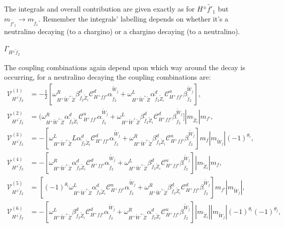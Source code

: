 \documentclass[final,3p,times,pdflatex]{elsarticle}
\begin{document}
The integrals and overall contribution are given exactly as for $H^{\pm} \tilde{f'}_1$ but $m_{\tilde{f'}_1} \rightarrow m_{\tilde{f}_1}$. Remember the integrals' labelling depends on whether it's a neutralino decaying (to a chargino) or a chargino decaying (to a neutralino).

\textbf{\underline{$\Gamma_{H^{\pm} \tilde{f}_2}$}}

The coupling combinations again depend upon which way around the decay is occurring, for a neutralino decaying the coupling combinations are:
\begin{align}
\mathcal{V}_{H^{\pm} \tilde{f}_2}^{(1)} &= -\frac{1}{2}[\omega_{H^+ \tilde{W}^+ \tilde{Z}}^R \beta_{\tilde{f}_2 \tilde{Z}_i}^{d} \mathcal{C}_{H^+ f f'}^d \alpha_{\tilde{f}_2}^{\tilde{W}_j} + \omega_{H^+ \tilde{W}^+ \tilde{Z}}^L \alpha_{\tilde{f}_2 \tilde{Z}_i}^{d} \mathcal{C}_{H^+ f f'}^u \beta_{\tilde{f}_2}^{\tilde{W}_j}], \\
\mathcal{V}_{H^{\pm} \tilde{f}_2}^{(2)} &= (\omega_{H^+ \tilde{W}^+ \tilde{Z}}^R \alpha_{\tilde{f}_2 \tilde{Z}_i}^{d} \mathcal{C}_{H^+ f f'}^u \alpha_{\tilde{f}_2}^{\tilde{W}_j} + \omega_{H^+ \tilde{W}^+ \tilde{Z}}^L \beta_{\tilde{f}_2 \tilde{Z}_i}^{d} \mathcal{C}_{H^+ f f'}^d \beta_{\tilde{f}_2}^{\tilde{W}_j}]|m_{\tilde{Z}_i}|m_{f'}, \\
\mathcal{V}_{H^{\pm} \tilde{f}_2}^{(3)} &= -[\omega_{H^+ \tilde{W}^+ \tilde{Z}}^LL \alpha_{\tilde{f}_2 \tilde{Z}_i}^{d} \mathcal{C}_{H^+ f f'}^d \alpha_{\tilde{f}_2}^{\tilde{W}_j} + \omega_{H^+ \tilde{W}^+ \tilde{Z}}^R \beta_{\tilde{f}_2 \tilde{Z}_i}^{d} \mathcal{C}_{H^+ f f'}^u \beta_{\tilde{f}_2}^{\tilde{W}_j}]m_{f}|m_{\tilde{W}_j}|(-1)^{\theta_i}, \\
\mathcal{V}_{H^{\pm} \tilde{f}_2}^{(4)} &= -[\omega_{H^+ \tilde{W}^+ \tilde{Z}}^R \alpha_{\tilde{f}_2 \tilde{Z}_i}^{d} \mathcal{C}_{H^+ f f'}^d \alpha_{\tilde{f}_2}^{\tilde{W}_j} + \omega_{H^+ \tilde{W}^+ \tilde{Z}}^L \beta_{\tilde{f}_2 \tilde{Z}_i}^{d} \mathcal{C}_{H^+ f f'}^u \beta_{\tilde{f}_2}^{\tilde{W}_j}]|m_{\tilde{Z}_i}|m_{f}, \\
\mathcal{V}_{H^{\pm} \tilde{f}_2}^{(5)} &= [(-1)^{\theta_i}\omega_{H^+ \tilde{W}^+ \tilde{Z}}^L \alpha_{\tilde{f}_2 \tilde{Z}_i}^{d} \mathcal{C}_{H^+ f f'}^u \alpha_{\tilde{f}_2}^{\tilde{W}_j} + \omega_{H^+ \tilde{W}^+ \tilde{Z}}^R \beta_{\tilde{f}_2 \tilde{Z}_i}^{d} \mathcal{C}_{H^+ f f'}^d \beta_{\tilde{f}_2}^{\tilde{W}_j}]m_{f'}|m_{\tilde{W}_j}|, \\
\mathcal{V}_{H^{\pm} \tilde{f}_2}^{(6)} &= -[\omega_{H^+ \tilde{W}^+ \tilde{Z}}^L \beta_{\tilde{f}_2 \tilde{Z}_i}^{d} \mathcal{C}_{H^+ f f'}^d \alpha_{\tilde{f}_2}^{\tilde{W}_j} + \omega_{H^+ \tilde{W}^+ \tilde{Z}}^R \alpha_{\tilde{f}_2 \tilde{Z}_i}^{d} \mathcal{C}_{H^+ f f'}^u \beta_{\tilde{f}_2}^{\tilde{W}_j}]|m_{\tilde{Z}_i}||m_{\tilde{W}_j}|(-1)^{\theta_i}(-1)^{\theta_j}, \\

\end{align}
\end{document}

